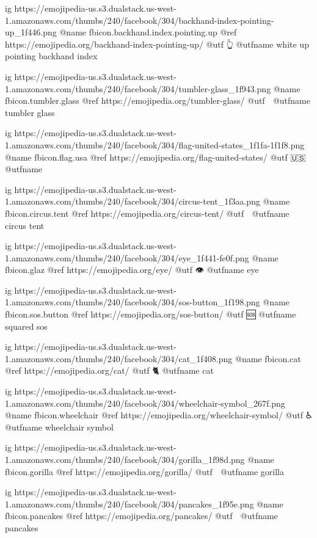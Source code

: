 	ig https://emojipedia-us.s3.dualstack.us-west-1.amazonaws.com/thumbs/240/facebook/304/backhand-index-pointing-up_1f446.png
	@name fbicon.backhand.index.pointing.up
	@ref https://emojipedia.org/backhand-index-pointing-up/
	@utf 👆
	@utfname white up pointing backhand index

	ig https://emojipedia-us.s3.dualstack.us-west-1.amazonaws.com/thumbs/240/facebook/304/tumbler-glass_1f943.png
	@name fbicon.tumbler.glass
	@ref https://emojipedia.org/tumbler-glass/
	@utf 🥃
	@utfname tumbler glass

	ig https://emojipedia-us.s3.dualstack.us-west-1.amazonaws.com/thumbs/240/facebook/304/flag-united-states_1f1fa-1f1f8.png
	@name fbicon.flag.usa
	@ref https://emojipedia.org/flag-united-states/
	@utf 🇺🇸
	@utfname

	ig https://emojipedia-us.s3.dualstack.us-west-1.amazonaws.com/thumbs/240/facebook/304/circus-tent_1f3aa.png
	@name fbicon.circus.tent
	@ref https://emojipedia.org/circus-tent/
	@utf 🎪
	@utfname circus tent

	ig https://emojipedia-us.s3.dualstack.us-west-1.amazonaws.com/thumbs/240/facebook/304/eye_1f441-fe0f.png
	@name fbicon.glaz
	@ref https://emojipedia.org/eye/
	@utf 👁
	@utfname eye

	ig https://emojipedia-us.s3.dualstack.us-west-1.amazonaws.com/thumbs/240/facebook/304/sos-button_1f198.png
	@name fbicon.sos.button
	@ref https://emojipedia.org/sos-button/
	@utf 🆘
	@utfname squared sos

	ig https://emojipedia-us.s3.dualstack.us-west-1.amazonaws.com/thumbs/240/facebook/304/cat_1f408.png
	@name fbicon.cat
	@ref https://emojipedia.org/cat/
	@utf 🐈
	@utfname cat

	ig https://emojipedia-us.s3.dualstack.us-west-1.amazonaws.com/thumbs/240/facebook/304/wheelchair-symbol_267f.png
	@name fbicon.wheelchair
	@ref https://emojipedia.org/wheelchair-symbol/
	@utf ♿
	@utfname wheelchair symbol

	ig https://emojipedia-us.s3.dualstack.us-west-1.amazonaws.com/thumbs/240/facebook/304/gorilla_1f98d.png
	@name fbicon.gorilla
	@ref https://emojipedia.org/gorilla/
	@utf 🦍
	@utfname gorilla

	ig https://emojipedia-us.s3.dualstack.us-west-1.amazonaws.com/thumbs/240/facebook/304/pancakes_1f95e.png
	@name fbicon.pancakes
	@ref https://emojipedia.org/pancakes/
	@utf 🥞
	@utfname pancakes

\fi

